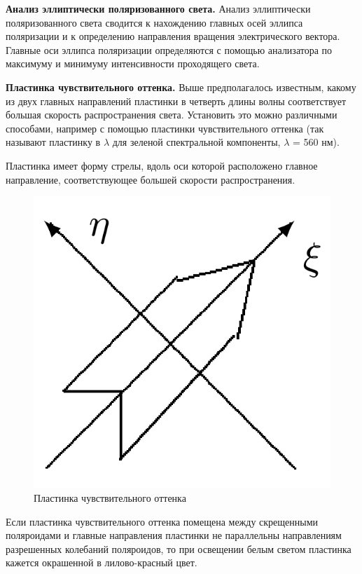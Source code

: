 \documentclass[a4paper,12pt]{article} %
\begin{document}
	
	\textbf{Анализ эллиптически поляризованного света.} Анализ эллиптически поляризованного света сводится к нахождению главных осей эллипса поляризации и к определению направления вращения электрического вектора. Главные оси эллипса поляризации определяются с помощью анализатора по максимуму и минимуму интенсивности проходящего света.


	\textbf{Пластинка чувствительного оттенка.} Выше предполагалось известным, какому из двух главных направлений пластинки в четверть длины волны соответствует большая скорость распространения света. Установить это можно различными способами, например с помощью пластинки чувствительного оттенка (так называют пластинку в $\lambda$ для зеленой спектральной компоненты, $\lambda$ = 560 нм).	
	
	Пластинка имеет форму стрелы, вдоль оси которой расположено главное направление, соответствующее большей скорости распространения.
	
	\begin{figure}
		\centering
		\includegraphics[scale=0.4]{Pictures/SensitivePlate}
		\caption{Пластинка чувствительного оттенка}
	\end{figure}
	
	Если пластинка чувствительного оттенка помещена между скрещенными поляроидами и главные направления пластинки не параллельны направлениям разрешенных колебаний поляроидов, то при освещении белым светом пластинка кажется окрашенной в лилово-красный цвет.
	
\end{document}
